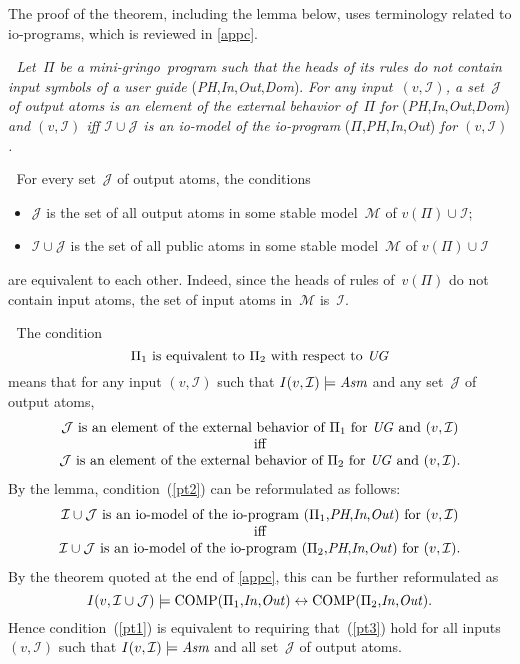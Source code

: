 \documentclass{new_tlp}
\def\lrar{\leftrightarrow}
\def\beq{\begin{equation}}
\def\eeq#1{\label{#1}\end{equation}}
\def\ba{\begin{array}}
\def\ea{\end{array}}
\def\gringo{{\sc gringo}}
\newcommand{\I}{\mathcal{I}}
\newcommand{\J}{\mathcal{J}}
\newcommand{\M}{\mathcal{M}}
\begin{document}
The proof of the theorem, including the lemma below, uses
terminology related to io-programs, which
is reviewed in \ref{appc}.

\medskip{}$\;$\emph{
Let~$\Pi$ be a mini-\gringo\ program such that the heads of its rules do not
contain input symbols of a user guide}
(\emph{PH},\emph{In},\emph{Out},\emph{Dom\/}). \emph{For any
  input~$(v,\I)$, a set~$\J$ of
  output atoms is an element of the external behavior
  of~$\Pi$ for} (\emph{PH},\emph{In},\emph{Out},\emph{Dom\/})
\emph{and $(v,\I)$ iff
$\I\cup\J$ is an io-model of the io-program}
($\Pi$,\emph{PH},\emph{In},\emph{Out}) \emph{for $(v,\I)$.}

\medskip{}$\;$
For every set~$\J$ of output atoms, the conditions
\begin{itemize}
\item $\J$ is the set of all output atoms in some stable model~$\M$ 
  of $v(\Pi)\cup\I$;
\item $\I\cup\J$ is the set of all public atoms in some stable
  model~$\M$ of $v(\Pi)\cup\I$
\end{itemize}
are equivalent to each other.  Indeed,
since the heads of rules of~$v(\Pi)$ do not contain
input atoms, the set of input atoms in~$\M$ is~$\I$.

\medskip{}$\;$
The condition
\beq
\Pi_1\hbox{ is equivalent to }\Pi_2\hbox{ with respect to }\emph{UG}
\eeq{pt1}
means that for any input $(v,\I)$ such that $I(v,\I)\models\emph{Asm}$
and any set~$\J$ of output atoms,
\beq\ba c
\J\hbox{ is an element of the external behavior
  of~$\Pi_1$ for \emph{UG} and }(v,\I)\\
\hbox{iff}\\
\J\hbox{ is an element of the external behavior
  of~$\Pi_2$ for \emph{UG} and }(v,\I).
\ea\eeq{pt2}
By the lemma, condition~(\ref{pt2}) can be reformulated as follows:
$$\ba c
\I\cup\J\hbox{ is an io-model of the io-program
($\Pi_1$,\emph{PH},\emph{In},\emph{Out}) for }(v,\I)\\
\hbox{iff}\\
\I\cup\J\hbox{ is an io-model of the io-program
($\Pi_2$,\emph{PH},\emph{In},\emph{Out}) for }(v,\I).\\
\ea$$
By the theorem quoted at the end of \ref{appc}, this can be further
reformulated as
\beq I(v,\I\cup\J) \models
\hbox{COMP($\Pi_1$,\emph{In\/},\emph{Out\/})}
\lrar
\hbox{COMP($\Pi_2$,\emph{In\/},\emph{Out\/})}.
\eeq{pt3}
Hence condition~(\ref{pt1}) is equivalent to requiring that~(\ref{pt3})
hold for all inputs $(v,\I)$ such that
$I(v,\I)\models\emph{Asm}$ and all set~$\J$ of output atoms.
\end{document}
